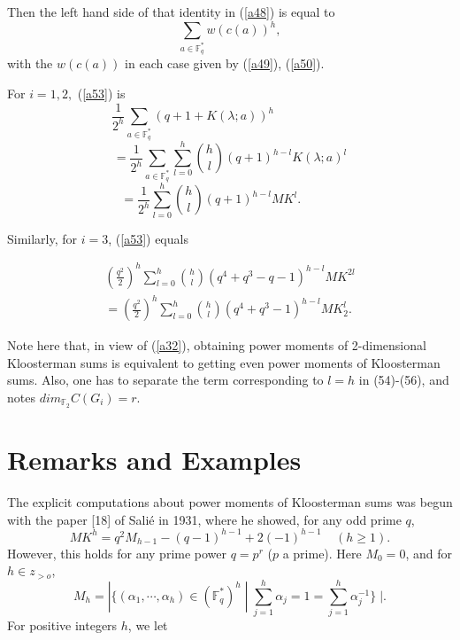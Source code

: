 \documentclass[a4,12pt]{elsart}
\begin{document}
Then the left hand side of that identity in (\ref{a48}) is equal to
\begin{equation}\label{a53}
\sum_{a \in {\mathbb{F}}_q^{*}}w(c(a))^h,
\end{equation}
with the $w(c(a))$ in each case given by (\ref{a49}), (\ref{a50}).

For $i=1, 2,$ (\ref{a53}) is
\begin{equation*}
\frac{1}{2^h } \sum_{ a \in {\mathbb{F}}_q^{*}}(q+1+K(\lambda;a))^h
\qquad\qquad\qquad
\end{equation*}
\begin{equation*}
=\frac{1}{2^h} \sum_{ a \in {\mathbb{F}}_q^{*} } \sum_{l=0}^{h}
\binom{h}{l}(q+1)^{h-l}K(\lambda;a)^l
\end{equation*}
\begin{equation}
=\frac{1}{2^h} \sum_{l=0}^{h} \binom{h}{l}(q+1)^{h-l} M
K^l.\qquad\;\;\;\;
\end{equation}

Similarly, for $i=3$, (\ref{a53}) equals

\begin{align}
(\frac{q^2}{2 })^h  \sum_{l=0}^{h} \binom{h}{l} (q^4 +q^3-q-1)^{h-l} MK^{2l} \\
=(\frac{q^2}{2 })^h \sum_{ l=0}^{h} \binom{h}{l}(q^4 +q^3
-1)^{h-l}MK_2^l.
\end{align}

Note here that, in view of (\ref{a32}), obtaining power moments of
2-dimensional Kloosterman sums is equivalent to getting even power
moments of Kloosterman sums. Also, one has to separate the term
corresponding to $l=h$ in (54)-(56), and notes $dim_{{\mathbb{F}}_2}
C(G_i)=r$.\\

\section{Remarks and Examples}
The explicit computations about power moments of Kloosterman sums
was begun with the paper [18] of Sali\'{e} in 1931, where he showed,
for any odd prime $q$,
\begin{equation}\label{a57}
MK^{h}=q^{2}M_{h-1}-(q-1)^{h-1}+2(-1)^{h-1} \;\;\;\; (h \geq 1).
\end{equation}
However, this holds for any prime power $q=p^r$ ($p$ a prime). Here
$M_0=0$, and for $h \in z_{>o}$,
\begin{equation*}
M_{h}=|\{(\alpha_1,\cdots,\alpha_h)\in({\mathbb{F}}_{q}^{*})^h \; | \;
\sum_{j=1}^{h}\alpha_j = 1 =\sum_{j=1}^{h} \alpha_{j}^{-1}\}\;|.
\end{equation*}
For positive integers $h$, we let
\end{document}
